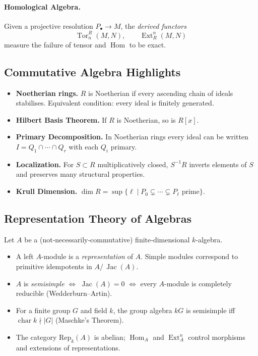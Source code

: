\paragraph{Homological Algebra.}
Given a projective resolution \(P_\bullet\to M\), the \emph{derived functors}
\[
\operatorname{Tor}^{R}_n(M,N),\qquad
\operatorname{Ext}^{n}_{R}(M,N)
\]
measure the failure of tensor and \(\operatorname{Hom}\) to be exact.

\subsection{Commutative Algebra Highlights}

\begin{itemize}
    \item \textbf{Noetherian rings.}  
          \(R\) is Noetherian if every ascending chain of ideals stabilises.
          Equivalent condition: every ideal is finitely generated.
    \item \textbf{Hilbert Basis Theorem.}  
          If \(R\) is Noetherian, so is \(R[x]\).
    \item \textbf{Primary Decomposition.}  
          In Noetherian rings every ideal can be written
          \(I = Q_1\cap\cdots\cap Q_r\) with each \(Q_i\) primary.
    \item \textbf{Localization.}  
          For \(S\subset R\) multiplicatively closed, \(S^{-1}R\)
          inverts elements of \(S\) and preserves many structural properties.
    \item \textbf{Krull Dimension.}  
          \(\dim R = \sup\{\ell\mid P_0\subsetneq\cdots\subsetneq P_\ell\text{ prime}\}\).
\end{itemize}

\subsection{Representation Theory of Algebras}

Let \(A\) be a (not‑necessarily‑commutative) finite‑dimensional \(k\)-algebra.

\begin{itemize}
    \item A left \(A\)-module is a \emph{representation} of \(A\).
          Simple modules correspond to
          primitive idempotents in \(A\!/\,\operatorname{Jac}(A)\).
    \item \(A\) is \emph{semisimple}  
          \(\Longleftrightarrow\) \(\operatorname{Jac}(A)=0\)
          \(\Longleftrightarrow\) every \(A\)-module is completely reducible  
          (Wedderburn–Artin).
    \item For a finite group \(G\) and field \(k\), the group algebra
          \(kG\) is semisimple iff \(\operatorname{char}k\nmid |G|\)
          (Maschke’s Theorem).
    \item The category \(\mathrm{Rep}_k(A)\) is abelian; 
          \(\operatorname{Hom}_A\) and \(\operatorname{Ext}^n_A\) control
          morphisms and extensions of representations.
\end{itemize}


